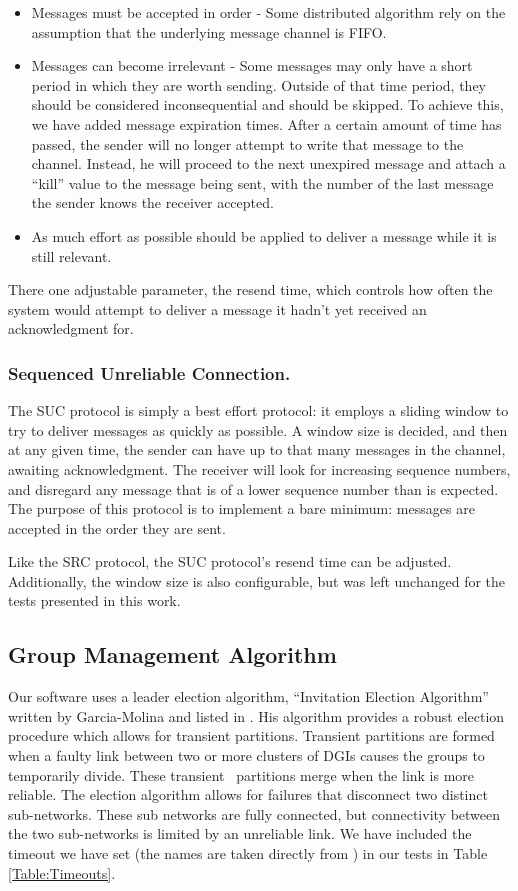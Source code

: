 \documentclass{llncs}
\begin{document}
\begin{itemize}
\item Messages must be accepted in order - Some distributed algorithm rely on the assumption that the underlying message channel is FIFO.
\item Messages can become irrelevant - Some messages may only have a short period in which they are worth sending. Outside of that time period, they should be considered inconsequential and should be skipped. To achieve this, we have added message expiration times. After a certain amount of time has passed, the sender will no longer attempt to write that message to the channel. Instead, he will proceed to the next unexpired message and attach a ``kill'' value to the message being sent, with the number of the last message the sender knows the receiver accepted.
\item As much effort as possible should be applied to deliver a message while it is still relevant.
\end{itemize}

There one adjustable parameter, the resend time, which controls how often the system would attempt to deliver a message it hadn't yet received an acknowledgment for.

\subsubsection{Sequenced Unreliable Connection.}

The SUC protocol is simply a best effort protocol: it employs a sliding window to try to deliver messages as quickly as possible. A window size is decided, and then at any given time, the sender can have up to that many messages in the channel, awaiting acknowledgment. The receiver will look for increasing sequence numbers, and disregard any message that is of a lower sequence number than is expected. The purpose of this protocol is to implement a bare minimum: messages are accepted in the order they are sent.

Like the SRC protocol, the SUC protocol's resend time can be adjusted. Additionally, the window size is also configurable, but was left unchanged for the tests presented in this work.

\subsection{Group Management Algorithm}

Our software uses a leader election algorithm, ``Invitation Election Algorithm'' written by Garcia-Molina and listed in \cite{INVITATIONELECTION}. His algorithm provides a robust election procedure which allows for transient partitions. Transient partitions are formed when a faulty link between two or more clusters of DGIs causes the groups to temporarily divide. These transient  partitions merge when the link is more reliable. The election algorithm allows for failures that disconnect two distinct sub-networks. These sub networks are fully connected, but connectivity between the two sub-networks is limited by an unreliable link.  We have included the timeout we have set (the names are taken directly from \cite{INVITATIONELECTION}) in our tests in Table \ref{Table:Timeouts}.
\end{document}
